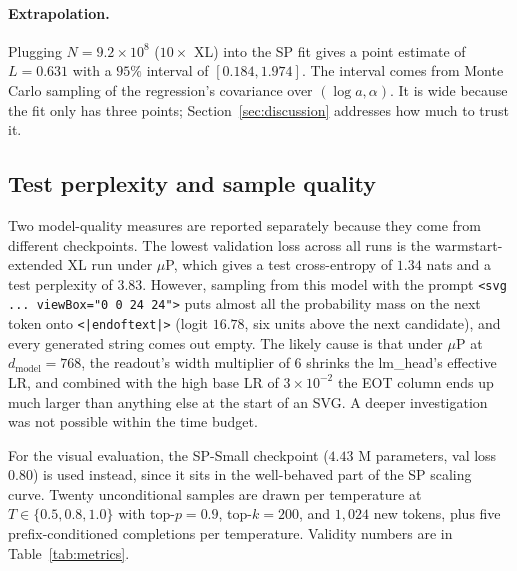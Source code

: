 \documentclass[11pt]{article}
\begin{document}
\paragraph{Extrapolation.}
Plugging $N = 9.2\!\times\!10^8$ ($10\!\times\!$ XL) into the SP fit gives a point estimate of $L = 0.631$ with a $95\%$ interval of $[0.184, 1.974]$. The interval comes from Monte Carlo sampling of the regression's covariance over $(\log a, \alpha)$. It is wide because the fit only has three points; Section~\ref{sec:discussion} addresses how much to trust it.

\subsection{Test perplexity and sample quality}

Two model-quality measures are reported separately because they come from different checkpoints. The lowest validation loss across all runs is the warmstart-extended XL run under $\mu$P, which gives a test cross-entropy of $1.34$ nats and a test perplexity of $3.83$. However, sampling from this model with the prompt \texttt{<svg ... viewBox="0 0 24 24">} puts almost all the probability mass on the next token onto \texttt{<|endoftext|>} (logit $16.78$, six units above the next candidate), and every generated string comes out empty. The likely cause is that under $\mu$P at $d_{\text{model}}\!=\!768$, the readout's width multiplier of $6$ shrinks the lm\_head's effective LR, and combined with the high base LR of $3\!\times\!10^{-2}$ the EOT column ends up much larger than anything else at the start of an SVG. A deeper investigation was not possible within the time budget.

For the visual evaluation, the SP-Small checkpoint ($4.43$ M parameters, val loss $0.80$) is used instead, since it sits in the well-behaved part of the SP scaling curve. Twenty unconditional samples are drawn per temperature at $T \in \{0.5, 0.8, 1.0\}$ with top-$p\!=\!0.9$, top-$k\!=\!200$, and $1{,}024$ new tokens, plus five prefix-conditioned completions per temperature. Validity numbers are in Table~\ref{tab:metrics}.
\end{document}
